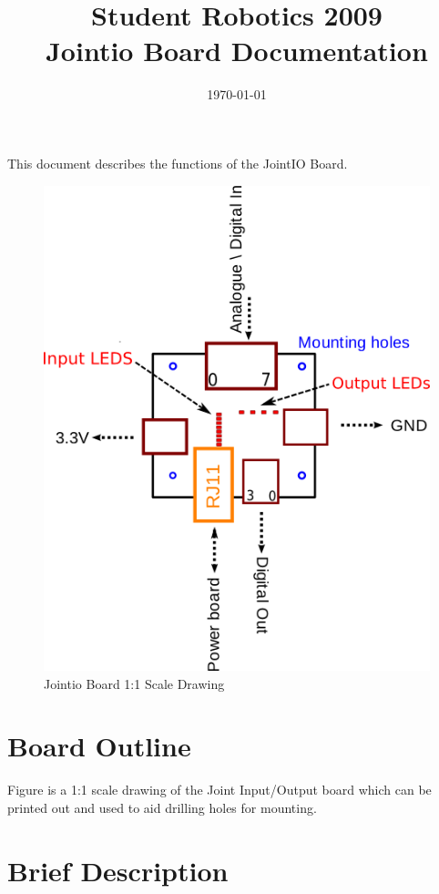 \documentclass[a4paper, 12pt]{article}
\title {Student Robotics 2009\\ Jointio Board Documentation}
\date{\today}
\begin{document}
\maketitle

\noindent This document describes the functions of the JointIO Board. 

\begin{figure}
\centering
\includegraphics[scale=1, angle=0]{outline}
\caption{Jointio Board 1:1 Scale Drawing}
\label{fig:outline}
\end{figure}


\section{Board Outline}
Figure \label{fig:outline} is a 1:1 scale drawing of the Joint Input/Output board which can be printed out and used to aid drilling holes for mounting.
\label{sec:outline}
\newpage
\section{Brief Description}
\end{document}
